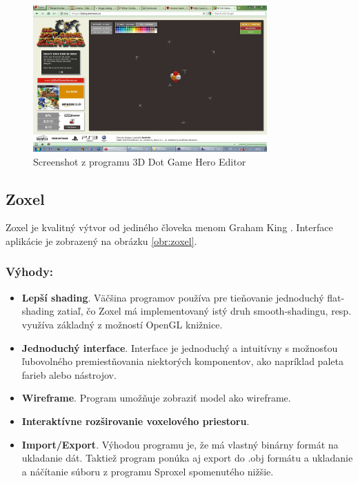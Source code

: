 \begin{figure}[ht!]
	\centering
	\includegraphics[width=0.8\textwidth]{3Dhero.jpg}
	\caption[3D Dot Game Hero Editor]{Screenshot z programu 3D Dot Game Hero Editor}
	\label{obr:hero}
\end{figure}


\subsection{Zoxel}
Zoxel je kvalitný výtvor od jediného človeka menom Graham King \cite{zoxel}. Interface aplikácie je zobrazený na obrázku \ref{obr:zoxel}.
\subsubsection{Výhody:}
\begin{itemize}
	\item \textbf{Lepší shading}. Väčšina programov používa pre tieňovanie jednoduchý flat-shading zatiaľ, čo Zoxel má implementovaný istý druh smooth-shadingu, resp. využíva základný z možností OpenGL knižnice.
	\item \textbf{Jednoduchý interface}. Interface je jednoduchý a intuitívny s možnosťou ľubovolného premiestňovania niektorých komponentov, ako napríklad paleta farieb alebo nástrojov.
	\item \textbf{Wireframe}. Program umožňuje zobraziť model ako wireframe.
	\item \textbf{Interaktívne rozširovanie voxelového priestoru}.
	\item \textbf{Import/Export}. Výhodou programu je, že má vlastný binárny formát na ukladanie dát. Taktiež program ponúka aj export do .obj formátu a ukladanie a náčítanie súboru z programu Sproxel spomenutého nižšie.
\end{itemize}
